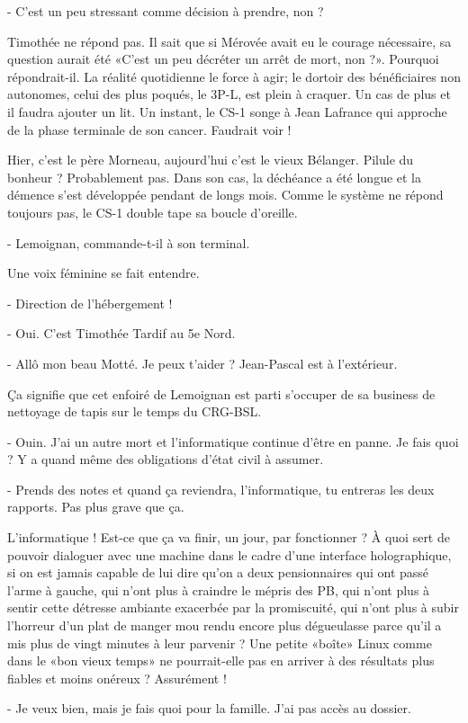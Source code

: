- C’est un peu stressant comme décision à prendre, non ?

Timothée ne répond pas. Il sait que si Mérovée avait eu le courage nécessaire, sa question aurait été «C’est un peu décréter un arrêt de mort, non ?». Pourquoi répondrait-il. La réalité quotidienne le force à agir; le dortoir des bénéficiaires non autonomes, celui des plus poqués, le 3P-L, est plein à craquer. Un cas de plus et il faudra ajouter un lit. Un instant, le CS-1 songe à Jean Lafrance qui approche de la phase terminale de son cancer. Faudrait voir !

Hier, c’est le père Morneau, aujourd’hui c’est le vieux Bélanger. Pilule du bonheur ? Probablement pas. Dans son cas, la déchéance a été longue et la démence s’est développée pendant de longs mois. Comme le système ne répond toujours pas, le CS-1 double tape sa boucle d’oreille.

- Lemoignan, commande-t-il à son terminal.

Une voix féminine se fait entendre.

- Direction de l’hébergement !

- Oui. C’est Timothée Tardif au 5e Nord.

- Allô mon beau Motté. Je peux t’aider ? Jean-Pascal est à l’extérieur.

Ça signifie que cet enfoiré de Lemoignan est parti s’occuper de sa business de nettoyage de tapis sur le temps du CRG-BSL.

- Ouin. J’ai un autre mort et l’informatique continue d’être en panne. Je fais quoi ? Y a quand même des obligations d’état civil à assumer.

- Prends des notes et quand ça reviendra, l’informatique, tu entreras les deux rapports. Pas plus grave que ça.

L’informatique ! Est-ce que ça va finir, un jour, par fonctionner ? À quoi sert de pouvoir dialoguer avec une machine dans le cadre d’une interface holographique, si on est jamais capable de lui dire qu’on a deux pensionnaires qui ont passé l’arme à gauche, qui n’ont plus à craindre le mépris des PB, qui n’ont plus à sentir cette détresse ambiante exacerbée par la promiscuité, qui n’ont plus à subir l’horreur d’un plat de manger mou rendu encore plus dégueulasse parce qu’il a mis plus de vingt minutes à leur parvenir ? Une petite «boîte» Linux comme dans le «bon vieux temps» ne pourrait-elle pas en arriver à des résultats plus fiables et moins onéreux ? Assurément !

- Je veux bien, mais je fais quoi pour la famille. J’ai pas accès au dossier.

